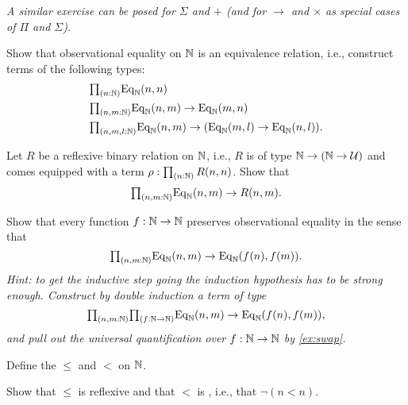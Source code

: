 \begin{exercises}
  \emph{A similar exercise can be posed for $\Sigma$ and $+$ (and for $\to$ and $\times$ as special cases of $\Pi$ and $\Sigma$).}
\item \label{ex:obs_nat_eqrel}Show that observational equality on $\mathbb{N}$ is an equivalence relation, i.e., construct terms of the following types:
  \begin{align*}
    & \prd{n:\N} \mathrm{Eq}_\N(n,n) \\
    & \prd{n,m:\N} \mathrm{Eq}_\N(n,m)\to \mathrm{Eq}_\N(m,n) \\
    & \prd{n,m,l:\N} \mathrm{Eq}_\N(n,m)\to (\mathrm{Eq}_\N(m,l)\to \mathrm{Eq}_\N(n,l)).
  \end{align*}
\item \label{ex:obs_nat_least}Let $R$ be a reflexive binary relation on $\mathbb{N}$, i.e., $R$ is of type $\mathbb{N}\to (\mathbb{N}\to\mathcal{U})$ and comes equipped with a term $\rho:\prd{n:\N}R(n,n)$. Show that
  \begin{equation*}
    \prd{n,m:\N} \mathrm{Eq}_\N(n,m)\to R(n,m).
  \end{equation*}
\item {}Show that every function $f:\mathbb{N}\to \mathbb{N}$ preserves observational equality in the sense that
  \begin{equation*}
    \prd{n,m:\N} \mathrm{Eq}_\N(n,m)\to \mathrm{Eq}_\N(f(n),f(m)).
  \end{equation*}
  \emph{Hint: to get the inductive step going the induction hypothesis has to be strong enough. Construct by double induction a term of type}
  \begin{equation*}
    \prd{n,m:\N}{f:\N\to\N} \mathrm{Eq}_\N(n,m)\to \mathrm{Eq}_\N(f(n),f(m)),
  \end{equation*}
  \emph{and pull out the universal quantification over $f:\mathbb{N}\to\mathbb{N}$ by \cref{ex:swap}.}
\item 
  \begin{subexenum}
  \item Define the  $\leq$ and $<$ on $\mathbb{N}$.
  \item Show that $\leq$ is reflexive and that $<$ is , i.e., that $\neg(n<n)$. 

\end{subexenum}
\end{exercises}
